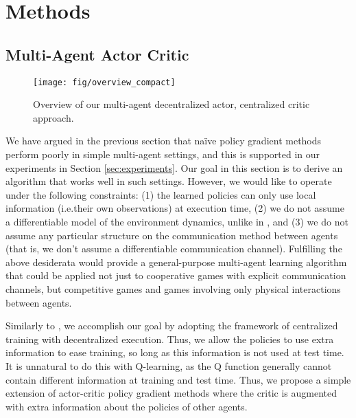 \documentclass{article}
\newcommand{\insertfigure}[3]{
\begin{figure}[ht]
\centering
\texttt{[image: fig/\#1]}
\caption{#3}
\label{fig:#1}
\end{figure}
}
\begin{document}
\section{Methods}
\label{sec:methods}
\subsection{Multi-Agent Actor Critic}\label{sec:maac}

\begin{wrapfigure}{r}{0.45\textwidth}
\vspace{-20mm}
\texttt{[image: fig/overview\_compact]}
\caption{\label{fig:model} Overview of our multi-agent decentralized actor, centralized critic approach.\vspace{-2mm}}
\end{wrapfigure}

We have argued in the previous section %
that na{\"i}ve policy gradient methods perform poorly in simple multi-agent settings, and this is supported in our experiments in Section \ref{sec:experiments}. Our goal in this section is to derive an algorithm that works well %
in such settings. However, we would like to operate under the following constraints: (1) the learned policies can only use local information (i.e.\@ their own observations) at execution time, (2) we do not assume a differentiable model of the environment dynamics, unlike in \cite{mordatch2017emergence}, %
and (3) we do not assume any particular structure on the communication method between agents (that is, we don't assume a differentiable communication channel). Fulfilling the above desiderata would provide a general-purpose multi-agent learning algorithm that could be applied not just to cooperative games with explicit communication channels, but competitive games and games involving only physical interactions between agents.


Similarly to \cite{foerster16b}, we accomplish our goal by adopting the framework of centralized training with decentralized execution. Thus, we allow the policies to use extra information to ease training, so long as this information is not used at test time. It is unnatural to do this with Q-learning, as the Q function generally cannot contain different information at training and test time. Thus, we propose a simple extension of actor-critic policy gradient methods where the critic is augmented with extra information about the policies of other agents. %
\end{document}
